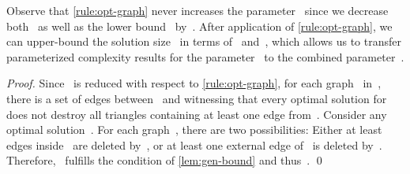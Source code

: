 \documentclass[envcountsame,numbook,smallextended]{svjour3}
\numberwithin{equation}{section}
\numberwithin{figure}{section}
\newcommand{\TAGP}{\textsc{Triangle Deletion with  Cost- Packing}}
\begin{document}
\noindent Observe that \cref{rule:opt-graph} never increases the parameter~ since we decrease both~ as well as the lower bound~ by~.
After application of \cref{rule:opt-graph}, we can upper-bound
the solution size~ in terms of~ and~, which allows us to transfer parameterized complexity results for the parameter~ to the combined parameter~.
\begin{proof}
  Since ~is reduced with respect to \cref{rule:opt-graph}, for each graph~ in~, there is a set of edges between~ and  witnessing that every optimal solution for~ does not destroy all triangles containing at least one edge from~.  Consider any optimal solution~. For each graph~, there are two possibilities: Either at least~ edges inside~ are deleted by~, or at least one external edge of~ is deleted by~.  Therefore, ~fulfills the condition of \cref{lem:gen-bound} and thus~.
\qed\end{proof}
\end{document}

